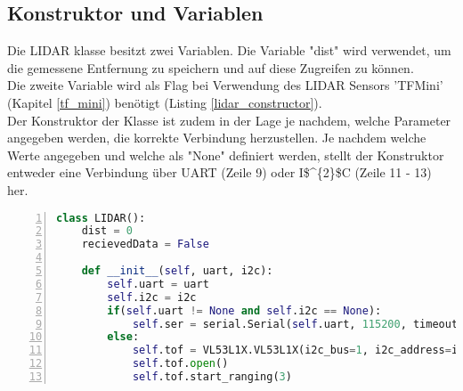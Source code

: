 \subsection{Konstruktor und Variablen}
Die \ac{LIDAR} klasse besitzt zwei Variablen. Die Variable "dist" wird verwendet, um die gemessene Entfernung zu speichern und auf diese Zugreifen zu können.\\
Die zweite Variable wird als Flag bei Verwendung des \ac{LIDAR} Sensors 'TFMini' (Kapitel \ref{tf_mini}) benötigt (Listing \ref{lidar_constructor}).\\
Der Konstruktor der Klasse ist zudem in der Lage je nachdem, welche Parameter angegeben werden, die korrekte Verbindung herzustellen. Je nachdem welche Werte angegeben und welche als "None"  definiert werden, stellt der Konstruktor entweder eine Verbindung über \ac{UART} (Zeile 9) oder \ac{I$^{2}$C} (Zeile 11 - 13) her. 
\begin{lstlisting}[caption={Kostruktor der Lidar Klasse}, language={Python}, label={lidar_constructor}, numbers=left]
class LIDAR():
    dist = 0
    recievedData = False

    def __init__(self, uart, i2c):
        self.uart = uart
        self.i2c = i2c
        if(self.uart != None and self.i2c == None):
            self.ser = serial.Serial(self.uart, 115200, timeout=1)
        else:
            self.tof = VL53L1X.VL53L1X(i2c_bus=1, i2c_address=i2c)
            self.tof.open()
            self.tof.start_ranging(3)
\end{lstlisting}
